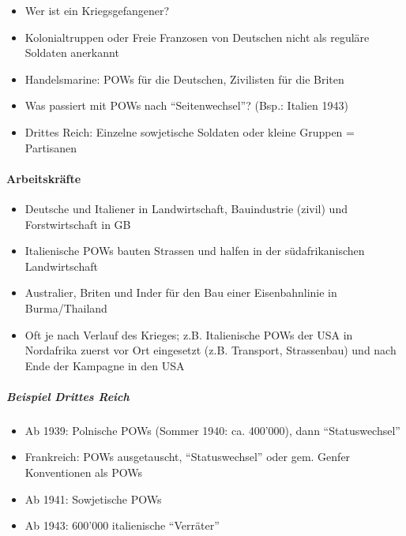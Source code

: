 {}\documentclass[a4paper]{article}
\providecommand{\tightlist}{\setlength{\itemsep}{1mm}\setlength{\parskip}{1mm}}
\begin{document}
\begin{itemize}
	\tightlist
	\item
	      Wer ist ein Kriegsgefangener?
	\item
	      Kolonialtruppen oder Freie Franzosen von Deutschen nicht als reguläre
	      Soldaten anerkannt
	\item
	      Handelsmarine: POWs für die Deutschen, Zivilisten für die Briten
	\item
	      Was passiert mit POWs nach ``Seitenwechsel''? (Bsp.: Italien 1943)
	\item
	      Drittes Reich: Einzelne sowjetische Soldaten oder kleine Gruppen =
	      Partisanen
\end{itemize}

\paragraph{Arbeitskräfte}\label{arbeitskruxe4fte-1}

\begin{itemize}
	\tightlist
	\item
	      Deutsche und Italiener in Landwirtschaft, Bauindustrie (zivil) und
	      Forstwirtschaft in GB
	\item
	      Italienische POWs bauten Strassen und halfen in der südafrikanischen
	      Landwirtschaft
	\item
	      Australier, Briten und Inder für den Bau einer Eisenbahnlinie in
	      Burma/Thailand
	\item
	      Oft je nach Verlauf des Krieges; z.B. Italienische POWs der USA in
	      Nordafrika zuerst vor Ort eingesetzt (z.B. Transport, Strassenbau) und
	      nach Ende der Kampagne in den USA
\end{itemize}

\subparagraph{Beispiel Drittes Reich}\label{beispiel-drittes-reich}

\begin{itemize}
	\tightlist
	\item
	      Ab 1939: Polnische POWs (Sommer 1940: ca. 400'000), dann
	      ``Statuswechsel''
	\item
	      Frankreich: POWs ausgetauscht, ``Statuswechsel'' oder gem. Genfer
	      Konventionen als POWs
	\item
	      Ab 1941: Sowjetische POWs
	\item
	      Ab 1943: 600'000 italienische ``Verräter''
\end{itemize}
\end{document}
